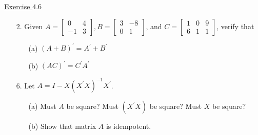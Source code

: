 \documentclass{./../../Latex/handout}
\begin{document}
\underline{Exercise $4.6$} 
\begin{itemize}

\item[2.] Given $A=\left[\begin{array}{rr}0 & 4 \\ -1 & 3\end{array}\right], B=\left[\begin{array}{rr}3 & -8 \\ 0 & 1\end{array}\right]$, and $C=\left[\begin{array}{lll}1 & 0 & 9 \\ 6 & 1 & 1\end{array}\right]$, verify that
\begin{enumerate}
\item[(a)] $(A+B)^{\prime}=A^{\prime}+B^{\prime}$
\item[(b)] $(A C)^{\prime}=C^{\prime} A^{\prime}$ 
\end{enumerate}

\item[6.]  Let \( A=I-X\left(X^{\prime} X\right)^{-1} X^{\prime} \).
\begin{enumerate}
\item[(a)] Must $A$ be square? Must $\left(X^{\prime} X\right)$ be square? Must $X$ be square?
\item[(b)] Show that matrix $A$ is idempotent.
\end{enumerate}
\end{itemize}
\end{document}
